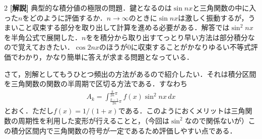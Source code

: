 \documentclass[../../main.tex]{subfiles}
\begin{document}
\begin{multicols}{2}
  {\bf [解説]}
  典型的な積分値の極限の問題．鍵となるのは$\sin nx$と三角関数の中に入った$n$をどのように評価するか．$n\to\infty$のときに$\sin nx$は激しく振動するが，うまいこと収束する部分を取り出して計算を進める必要がある．解答では$\sin^2 nx$を半角公式で展開した．$n$をを積分から取り出すてっとり早い方法は部分積分なので覚えておきたい．$\cos 2nx$のほうが$0$に収束することがかなりゆるい不等式評価でわかり，かなり簡単に答えが求まる問題となっている．

  さて，別解としてもうひとつ頻出の方法があるので紹介したい．それは積分区間を三角関数の関数の半周期で区切る方法である．すなわち
  \begin{align}
    A_k = \int_{\frac{k-1}{2n}\pi}^{\frac{k}{2n}\pi} f(x) \sin^2 nx \, dx
  \end{align}
  とおく．ただし$f(x)=1/(1+x)$である．このようにおくメリットは三角関数の周期性を利用した変形が行えることと，（今回は$\sin^2$なので関係ないが）この積分区間内で三角関数の符号が一定であるため評価しやすい点である．


\end{multicols}
\end{document}
